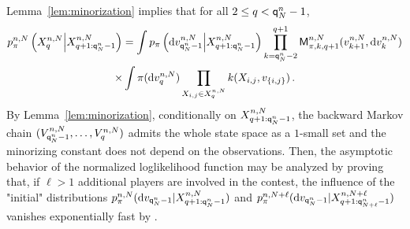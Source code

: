 Lemma~\ref{lem:minorization} implies that for all $2\le q< {\mathsf{q}}^{n}_{N}-1$,
\begin{multline*}
p_{\pi}^{n,N}\left(X^{n,N}_{q}\middle|X^{n,N}_{q+1:{\mathsf{q}}^{n}_{N}-1}\right) = \int p_{\pi}\left(\mathrm{d} v_{{\mathsf{q}}^{n}_{N}-1}^{n,N}\middle | X^{n,N}_{q+1:{\mathsf{q}}^{n}_{N}-1}\right) \prod_{k ={\mathsf{q}}^{n}_{N}-2}^{q+1}\mathsf{M}^{n,N}_{\pi,k,q+1}(v_{k+1}^{n,N},\mathrm{d} v_k^{n,N})\\
\times\int \pi(\mathrm{d} v_q^{n,N})\prod_{X_{i,j}\in X_{q}^{n,N}}k(X_{i,j},v_{\{i,j\}})\,.
\end{multline*}
By Lemma~\ref{lem:minorization}, conditionally on $X_{q+1:{\mathsf{q}}^{n}_{N}-1}^{n,N}$, the backward Markov chain $(V_{{\mathsf{q}}^{n}_{N}-1}^{n,N},\ldots,V_{q}^{n,N})$ admits the whole state space as a $1$-small set and the minorizing constant does not depend on the observations. Then, the asymptotic behavior of the normalized loglikelihood function may be analyzed by proving that, if $\ell>1$ additional players are involved in the contest, the influence of the "initial" distributions $p_{\pi}^{n,N}(\mathrm{d} v_{{\mathsf{q}}^{n}_{N}-1}|X^{n,N}_{q+1:{\mathsf{q}}^{n}_{N}-1})$ and $p_{\pi}^{n,N+\ell}(\mathrm{d} v_{{\mathsf{q}}^{n}_{N}-1}|X^{n,N+\ell}_{q+1:{\mathsf{q}}^{n}_{N+\ell}-1})$ vanishes exponentially fast by \cite{lindvall:1992}.
